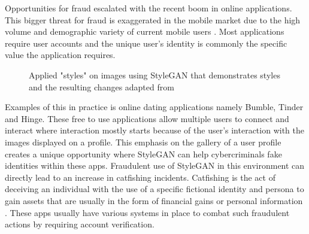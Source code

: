 Opportunities for fraud escalated with the recent boom in online applications. This bigger threat for fraud is exaggerated in the mobile market due to the high volume and demographic variety of current mobile users \citep{Mitra2021}. Most applications require user accounts and the unique user’s identity is commonly the specific value the application requires.

\begin{figure}[H]%
\centering
{}%
\caption{Applied "styles" on images using StyleGAN that demonstrates styles and the resulting changes adapted from \cite{Karras2019}}%
\label{fig:1}%
\end{figure}

Examples of this in practice is online dating applications namely Bumble, Tinder and Hinge. These free to use applications allow multiple users to connect and interact where interaction mostly starts because of the user’s interaction with the images displayed on a profile. This emphasis on the gallery of a user profile creates a unique opportunity where StyleGAN can help cybercriminals fake identities within these apps. Fraudulent use of StyleGAN in this environment can directly lead to an increase in catfishing incidents. Catfishing is the act of deceiving an individual with the use of a specific fictional identity and persona to gain assets that are usually in the form of financial gains or personal information \citep{Chandler2016}. These apps usually have various systems in place to combat such fraudulent actions by requiring account verification. 

